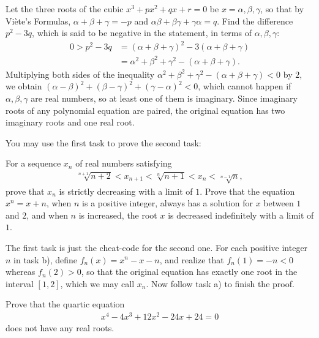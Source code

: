 \documentclass[12pt,a4paper]{memoir}
\theoremstyle{definition}
\begin{document}
\begin{solution}
	Let the three roots of the cubic $x^3+px^2+qx+r=0$ be $x=\alpha, \beta, \gamma$, so that by Viète's Formulas, $\alpha+\beta+\gamma=-p$ and $\alpha\beta+\beta\gamma+\gamma\alpha=q$. Find the difference $p^2-3q$, which is said to be negative in the statement, in terms of $\alpha,\beta,\gamma$:
	\begin{align*}
		0 > p^2 - 3q &= (\alpha+\beta+\gamma)^2 - 3(\alpha+\beta+\gamma)\\
		&= \alpha^2+\beta^2+\gamma^2-(\alpha+\beta+\gamma).
	\end{align*}
	Multiplying both sides of the inequality $\alpha^2+\beta^2+\gamma^2-(\alpha+\beta+\gamma) < 0$ by $2$, we obtain $(\alpha-\beta)^2+(\beta-\gamma)^2+(\gamma-\alpha)^2 < 0$, which cannot happen if $\alpha,\beta,\gamma$ are real numbers, so at least one of them is imaginary. Since imaginary roots of any polynomial equation are paired, the original equation has two imaginary roots and one real root.
\end{solution}

\begin{question}
	You may use the first task to prove the second task:
	\begin{tasks}
		\task For a sequence $x_n$ of real numbers satisfying
		\begin{align*}
			\sqrt[n+1]{n+2} < x_{n+1} < \sqrt[n]{n+1} < x_n < \sqrt[n-1]{n},
		\end{align*}
		prove that $x_n$ is strictly decreasing with a limit of $1$.
		\task Prove that the equation $x^n=x+n$, when $n$ is a positive integer, always has a solution for $x$ between $1$ and $2$, and when $n$ is increased, the root $x$ is decreased indefinitely with a limit of $1$.
	\end{tasks}
\end{question}

\begin{solution}
	The first task is just the cheat-code for the second one. For each positive integer $n$ in task b), define $f_n(x)=x^n-x-n$, and realize that $f_n(1)=-n<0$ whereas $f_n(2)>0$, so that the original equation has exactly one root in the interval $[1,2]$, which we may call $x_n$. Now follow task a) to finish the proof.
\end{solution}

\begin{question}
	Prove that the quartic equation
	\begin{align*}
		x^4-4x^3+12x^2-24x+24=0
	\end{align*}
	does not have any real roots.
\end{question}
\end{document}
